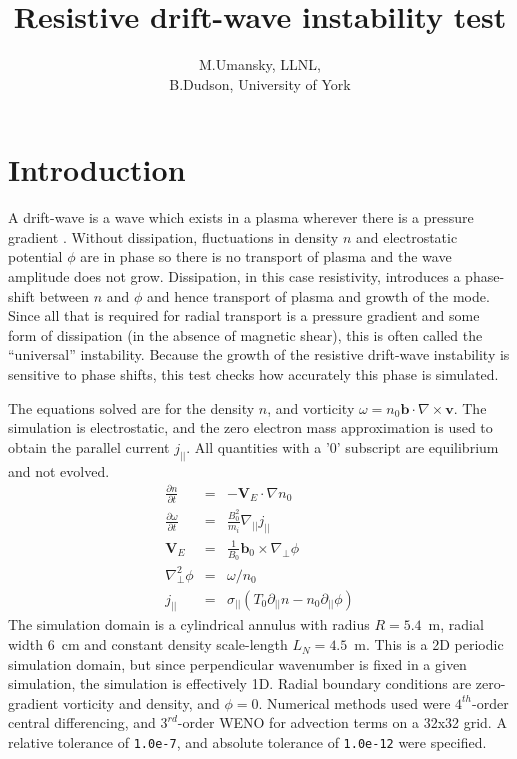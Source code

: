 \documentclass[12pt]{article}
\newcommand{\deriv}[2]{\ensuremath{\frac{\partial #1}{\partial #2}}}
\newcommand{\code}[1]{\texttt{#1}}
\newcommand{\Curl}[1]{\ensuremath{\nabla\times #1 }}
\begin{document}
\title{Resistive drift-wave instability test}
\author{M.Umansky, LLNL, \\
B.Dudson, University of York}
\maketitle

\tableofcontents

\section{Introduction}

A drift-wave is a wave which exists in a plasma wherever there is a pressure
gradient \cite{hazeltine-2003}.
Without dissipation, fluctuations in density $n$ and electrostatic
potential $\phi$ are in phase
so there is no transport of plasma and the wave amplitude does not grow.
Dissipation, in this case resistivity, introduces a phase-shift
between $n$ and $\phi$ and hence transport of plasma and growth of the mode.
Since all that is required for radial transport is a pressure gradient
and some form of dissipation (in the absence of magnetic shear), this is often called the ``universal''
instability. 
Because the growth of the resistive drift-wave instability is sensitive to
phase shifts, this test checks how accurately this phase is simulated.

The equations solved are for the density $n$, and vorticity
$\omega = n_0\mathbf{b}\cdot\Curl{\mathbf{v}}$.
The simulation is electrostatic, and the zero electron mass approximation
is used to obtain the parallel current $j_{||}$. All quantities with a '$0$'
subscript are equilibrium and not evolved.
\begin{eqnarray*}
\deriv{n}{t} &=& -\mathbf{V}_E\cdot\nabla n_0 \\
\deriv{\omega}{t} &=& \frac{B_0^2}{m_i}\nabla_{||}j_{||} \\
\mathbf{V}_E &=& \frac{1}{B_0}\mathbf{b}_0\times\nabla_\perp\phi \\
\nabla_\perp^2\phi &=& \omega/n_0 \\
j_{||} &=& \sigma_{||}\left(T_0\partial_{||}n - n_0\partial_{||}\phi\right)
\end{eqnarray*}
The simulation domain is a cylindrical annulus with radius $R = 5.4$~m, radial width $6$~cm and constant
density scale-length $L_N = 4.5$~m. This is a 2D periodic simulation domain, but since perpendicular
wavenumber is fixed in a given simulation, the simulation is effectively 1D. Radial boundary conditions are
zero-gradient vorticity and density, and $\phi = 0$. 
Numerical methods used were $4^{th}$-order central differencing, and $3^{rd}$-order WENO for advection terms
on a 32x32 grid. A relative tolerance of \code{1.0e-7}, and absolute tolerance of \code{1.0e-12} were specified.
\end{document}
